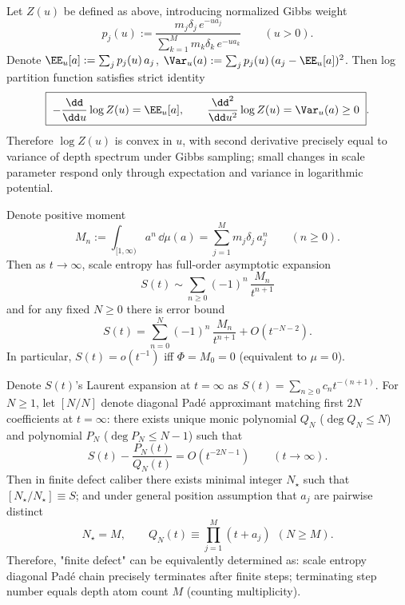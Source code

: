 \begin{proposition}
Let \(Z(u)\) be defined as above, introducing normalized Gibbs weight
\[
p_j(u):=\frac{m_j\delta_j\,e^{-u a_j}}{\sum_{k=1}^{M}m_k\delta_k\,e^{-u a_k}}
\qquad (u>0).
\]
Denote \(\EE_u[a]:=\sum_j p_j(u)\,a_j\), \(\Var_u(a):=\sum_j p_j(u)\,(a_j-\EE_u[a])^2\).
Then log partition function satisfies strict identity
\[
\boxed{\;
-\frac{\dd}{\dd u}\log Z(u)=\EE_u[a],\qquad
\frac{\dd^2}{\dd u^2}\log Z(u)=\Var_u(a)\ge 0\; }.
\]
Therefore \(\log Z(u)\) is convex in \(u\), with second derivative precisely equal to variance of depth spectrum under Gibbs sampling; small changes in scale parameter respond only through expectation and variance in logarithmic potential.
\end{proposition}

\begin{proposition}
Denote positive moment
\[
M_n:=\int_{[1,\infty)}a^{n}\,\dd\mu(a)=\sum_{j=1}^{M}m_j\delta_j\,a_j^{n}
\qquad (n\ge 0).
\]
Then as \(t\to\infty\), scale entropy has full-order asymptotic expansion
\[
\boxed{\;
S(t)\sim \sum_{n\ge0}(-1)^n\,\frac{M_n}{t^{n+1}}\;}
\]
and for any fixed \(N\ge 0\) there is error bound
\[
S(t)=\sum_{n=0}^{N}(-1)^n\,\frac{M_n}{t^{n+1}}+O(t^{-N-2}).
\]
In particular, \(S(t)=o(t^{-1})\) iff \(\Phi=M_0=0\) (equivalent to \(\mu=0\)).
\end{proposition}

\begin{proposition}
Denote \(S(t)\)'s Laurent expansion at \(t=\infty\) as \(S(t)=\sum_{n\ge0}c_n t^{-(n+1)}\).
For \(N\ge 1\), let \([N/N]\) denote diagonal Padé approximant matching first \(2N\) coefficients at \(t=\infty\): there exists unique monic polynomial \(Q_N\) (\(\deg Q_N\le N\)) and polynomial \(P_N\) (\(\deg P_N\le N-1\)) such that
\[
S(t)-\frac{P_N(t)}{Q_N(t)}=O(t^{-2N-1})\qquad (t\to\infty).
\]
Then in finite defect caliber there exists minimal integer \(N_\star\) such that \([N_\star/N_\star]\equiv S\); and under general position assumption that \(a_j\) are pairwise distinct
\[
\boxed{\;N_\star=M,\qquad Q_N(t)\equiv \prod_{j=1}^{M}(t+a_j)\ \ (N\ge M).\;}
\]
Therefore, "finite defect" can be equivalently determined as: scale entropy diagonal Padé chain precisely terminates after finite steps; terminating step number equals depth atom count \(M\) (counting multiplicity).
\end{proposition}

